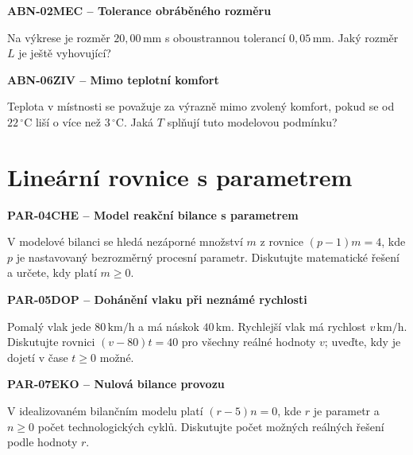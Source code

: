\documentclass[11pt,a4paper]{article}
\begin{document}
\vspace{4mm}\par\noindent\dotfill\par\medskip
\par\medskip\noindent\textbf{ABN-02}\quad\textbf{MEC -- Tolerance obráběného rozměru}\par
Na výkrese je rozměr $20{,}00\,\mathrm{mm}$ s oboustrannou tolerancí $0{,}05\,\mathrm{mm}$. Jaký rozměr $L$ je ještě vyhovující?

\vspace{4mm}\par\noindent\dotfill\par\medskip
\par\medskip\noindent\textbf{ABN-06}\quad\textbf{ZIV -- Mimo teplotní komfort}\par
Teplota v místnosti se považuje za výrazně mimo zvolený komfort, pokud se od $22\,{}^\circ\mathrm C$ liší o více než $3\,{}^\circ\mathrm C$. Jaká $T$ splňují tuto modelovou podmínku?

\vspace{4mm}\par\noindent\dotfill\par\medskip

\section{Lineární rovnice s parametrem}
\par\medskip\noindent\textbf{PAR-04}\quad\textbf{CHE -- Model reakční bilance s parametrem}\par
V modelové bilanci se hledá nezáporné množství $m$ z rovnice $(p-1)m=4$, kde $p$ je nastavovaný bezrozměrný procesní parametr. Diskutujte matematické řešení a určete, kdy platí $m\ge0$.

\vspace{4mm}\par\noindent\dotfill\par\medskip
\par\medskip\noindent\textbf{PAR-05}\quad\textbf{DOP -- Dohánění vlaku při neznámé rychlosti}\par
Pomalý vlak jede $80\,\mathrm{km/h}$ a má náskok $40\,\mathrm{km}$. Rychlejší vlak má rychlost $v\,\mathrm{km/h}$. Diskutujte rovnici $(v-80)t=40$ pro všechny reálné hodnoty $v$; uveďte, kdy je dojetí v čase $t\ge0$ možné.

\vspace{4mm}\par\noindent\dotfill\par\medskip
\par\medskip\noindent\textbf{PAR-07}\quad\textbf{EKO -- Nulová bilance provozu}\par
V idealizovaném bilančním modelu platí $(r-5)n=0$, kde $r$ je parametr a $n\ge0$ počet technologických cyklů. Diskutujte počet možných reálných řešení podle hodnoty $r$.
\end{document}
